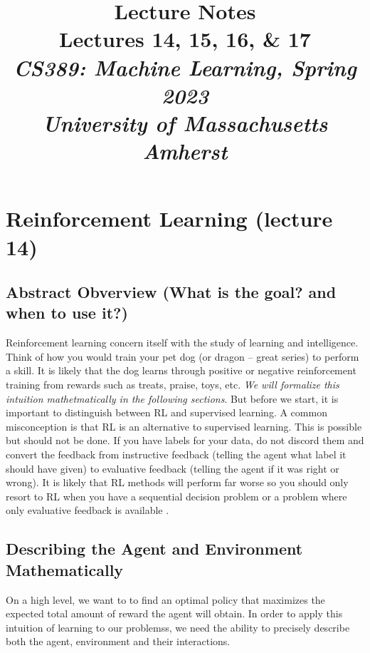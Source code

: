 \documentclass[11pt]{article}
\numberwithin{equation}{section}
\theoremstyle{definition}%
\begin{document}
\noindent
\title{Lecture Notes\\\vspace{0em}
\large Lectures 14, 15, 16, \& 17\\
\normalsize \emph{CS389: Machine Learning, Spring 2023}\\
\emph{University of Massachusetts Amherst}
\date{\smallheader}
}
\maketitle

\section{Reinforcement Learning (lecture 14)}

\subsection{Abstract Obverview (What is the goal? and when to use it?)}

Reinforcement learning concern itself with the study of learning and intelligence. Think of how you would train your pet dog (or dragon -- great series) to perform a skill. It is likely that the dog learns through positive or negative reinforcement training from rewards such as treats, praise, toys, etc. \emph{We will formalize this intuition mathetmatically in the following sections}. But before we start, it is important to distinguish between RL and supervised learning. A common misconception is that RL is an alternative to supervised learning. This is possible but should not be done. If you have labels for your data, do not discord them and convert the feedback from instructive feedback (telling the agent what label it should have given) to evaluative feedback (telling the agent if it was right or wrong). It is likely that RL methods will perform far worse so you should only resort to RL when you have a sequential decision problem or a problem where only evaluative feedback is available \cite{Bruno}.

\subsection{Describing the Agent and Environment Mathematically}

On a high level, we want to to find an optimal policy that maximizes the expected total amount of reward the agent will obtain. In order to apply this intuition of learning to our problemss, we need the ability to precisely describe both the agent, environment and their interactions. 
\end{document}
